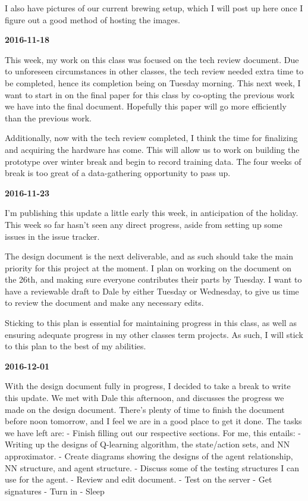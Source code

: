 I also have pictures of our current brewing setup, which I will post up here once I figure out a good method of hosting the images.

\textbf{2016-11-18}

This week, my work on this class was focused on the tech review document. Due to unforeseen circumstances in other classes, the tech review needed extra time to be completed, hence its completion being on Tuesday morning.
This next week, I want to start in on the final paper for this class by co-opting the previous work we have into the final document.
Hopefully this paper will go more efficiently than the previous work.

Additionally, now with the tech review completed, I think the time for finalizing and acquiring the hardware has come. This will allow us to work on building the prototype over winter break and begin to record training data. The four weeks of break is too great of a data-gathering opportunity to pass up.

\textbf{2016-11-23}

I'm publishing this update a little early this week, in anticipation of the holiday.
This week so far hasn't seen any direct progress, aside from setting up some issues in the issue tracker.

The design document is the next deliverable, and as such should take the main priority for this project at the moment.
I plan on working on the document on the 26th, and making sure everyone contributes their parts by Tuesday. I want to have a reviewable draft to Dale by either Tuesday or Wednesday, to give us time to review the document and make any necessary edits.

Sticking to this plan is essential for maintaining progress in this class, as well as ensuring adequate progress in my other classes term projects. As such, I will stick to this plan to the best of my abilities.

\textbf{2016-12-01}

With the design document fully in progress, I decided to take a break to write this update.
We met with Dale this afternoon, and discusses the progress we made on the design document. There's plenty of time to finish the document before noon tomorrow, and I feel we are in a good place to get it done. The tasks we have left are:
- Finish filling out our respective sections. For me, this entails:
  - Writing up the designs of Q-learning algorithm, the state/action sets, and NN approximator.
  - Create diagrams showing the designs of the agent relationship, NN structure, and agent structure.
  - Discuss some of the testing structures I can use for the agent.
- Review and edit document.
- Test on the server
- Get signatures
- Turn in
- Sleep

